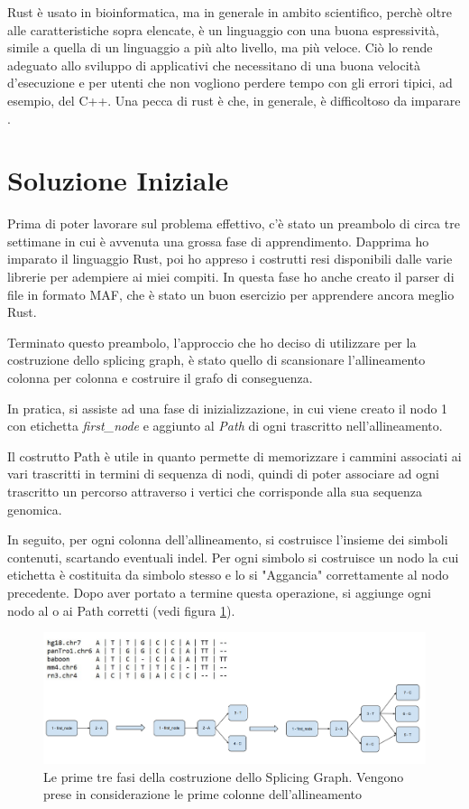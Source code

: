 Rust è usato in bioinformatica, ma in generale in ambito scientifico, perchè oltre alle caratteristiche sopra elencate, è un linguaggio con una buona espressività, simile a quella di un linguaggio a più alto livello, ma più veloce. Ciò lo rende adeguato allo sviluppo di applicativi che necessitano di una buona velocità d'esecuzione e per utenti che non vogliono perdere tempo con gli errori tipici, ad esempio, del C++. Una pecca di rust è che, in generale, è difficoltoso da imparare \cite{whyrust}. 

\section{Soluzione Iniziale}
Prima di poter lavorare sul problema effettivo, c'è stato un preambolo di circa tre settimane in cui è avvenuta una grossa fase di apprendimento. Dapprima ho imparato il linguaggio Rust, poi ho appreso i costrutti resi disponibili dalle varie librerie per adempiere ai miei compiti. In questa fase ho anche creato il parser di file in formato MAF, che è stato un buon esercizio per apprendere ancora meglio Rust.

Terminato questo preambolo, l'approccio che ho deciso di utilizzare per la costruzione dello splicing graph, è stato quello di scansionare l'allineamento colonna per colonna e costruire il grafo di conseguenza. 

In pratica, si assiste ad una fase di inizializzazione, in cui viene creato il nodo 1 con etichetta \textit{first\_node} e aggiunto al \textit{Path} di ogni trascritto nell'allineamento. 

Il costrutto Path è utile in quanto permette di memorizzare i cammini associati ai vari trascritti in termini di sequenza di nodi, quindi di poter associare ad ogni trascritto un percorso attraverso i vertici che corrisponde alla sua sequenza genomica.

In seguito, per ogni colonna dell'allineamento, si costruisce l'insieme dei simboli contenuti, scartando eventuali indel. Per ogni simbolo si costruisce un nodo la cui etichetta è costituita da simbolo stesso e lo si "Aggancia" correttamente al nodo precedente. Dopo aver portato a termine questa operazione, si aggiunge ogni nodo al o ai Path corretti (vedi figura \ref{fig:SplicingGraphConstructionPhases}).

\begin{figure}
    \centering
    \includegraphics[scale=0.43]{images/Fasi primo approccio.PNG}
    \caption{Le prime tre fasi della costruzione dello Splicing Graph. Vengono prese in considerazione le prime colonne dell'allineamento}
    \label{fig:SplicingGraphConstructionPhases}
\end{figure}

